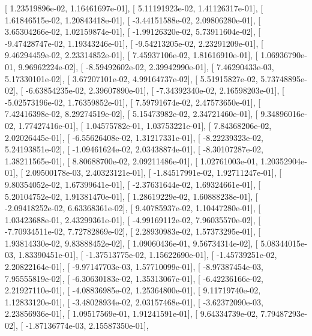 \documentclass{article}
\begin{document}
       [  1.23519896e-02,   1.16461697e-01],
       [  5.11191923e-02,   1.41126317e-01],
       [  1.61846515e-02,   1.20843418e-01],
       [ -3.44151588e-02,   2.09806280e-01],
       [  3.65304266e-02,   1.02159874e-01],
       [ -1.99126320e-02,   5.73911604e-02],
       [ -9.47428747e-02,   1.19343246e-01],
       [ -9.54213205e-02,   2.23291209e-01],
       [  9.46294459e-02,   2.23314852e-01],
       [  7.45937106e-02,   1.81616910e-01],
       [  1.06936790e-01,   9.96962224e-02],
       [ -8.59492602e-02,   2.39942990e-01],
       [  7.46290433e-03,   5.17330101e-02],
       [  3.67207101e-02,   4.99164737e-02],
       [  5.51915827e-02,   5.73748895e-02],
       [ -6.63854235e-02,   2.39607890e-01],
       [ -7.34392340e-02,   2.16598203e-01],
       [ -5.02573196e-02,   1.76359852e-01],
       [  7.59791674e-02,   2.47573650e-01],
       [  7.42416398e-02,   8.29274519e-02],
       [  5.15473982e-02,   2.34721460e-01],
       [  9.34896016e-02,   1.77427416e-01],
       [  1.04575782e-01,   1.03753221e-01],
       [  7.84368206e-02,   2.02026445e-01],
       [ -6.55626408e-02,   1.31217331e-01],
       [ -8.22239323e-02,   5.24193851e-02],
       [ -1.09461624e-02,   2.03438874e-01],
       [ -8.30107287e-02,   1.38211565e-01],
       [  8.80688700e-02,   2.09211486e-01],
       [  1.02761003e-01,   1.20352904e-01],
       [  2.09500178e-03,   2.40323121e-01],
       [ -1.84517991e-02,   1.92711247e-01],
       [  9.80354052e-02,   1.67399641e-01],
       [ -2.37631644e-02,   1.69324661e-01],
       [  5.20104752e-02,   1.91381470e-01],
       [  1.28619229e-02,   1.60888238e-01],
       [ -2.09418252e-02,   6.63368361e-02],
       [  9.40785937e-02,   1.10447280e-01],
       [  1.03423688e-01,   2.43299361e-01],
       [ -4.99169112e-02,   7.96035570e-02],
       [ -7.70934511e-02,   7.72782869e-02],
       [  2.28930983e-02,   1.57373295e-01],
       [  1.93814330e-02,   9.83888452e-02],
       [  1.09060436e-01,   9.56734314e-02],
       [  5.08344015e-03,   1.83390451e-01],
       [ -1.37513775e-02,   1.15622690e-01],
       [ -1.45739251e-02,   2.20822164e-01],
       [ -9.97147703e-03,   1.57710099e-01],
       [ -8.97387454e-03,   7.95555819e-02],
       [ -6.30630183e-02,   1.35313067e-01],
       [ -6.42236166e-02,   2.21927110e-01],
       [ -4.08836985e-02,   1.25364800e-01],
       [  9.11719740e-02,   1.12833120e-01],
       [ -3.48028934e-02,   2.03157468e-01],
       [ -3.62372090e-03,   2.23856936e-01],
       [  1.09517569e-01,   1.91241591e-01],
       [  9.64334739e-02,   7.79487293e-02],
       [ -1.87136774e-03,   2.15587350e-01],
\end{document}
